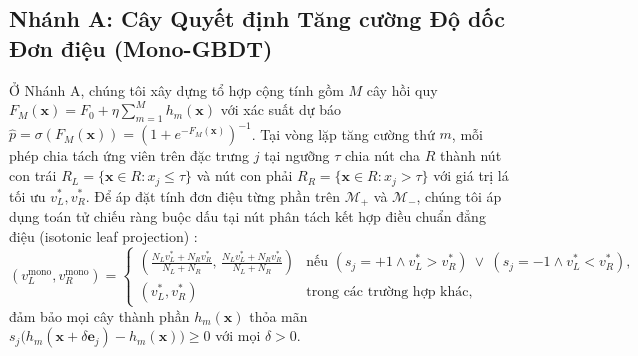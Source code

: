 \documentclass[11pt,a4paper]{article}
\begin{document}
\subsection{Nhánh A: Cây Quyết định Tăng cường Độ dốc Đơn điệu (Mono-GBDT)}
Ở Nhánh A, chúng tôi xây dựng tổ hợp cộng tính gồm $M$ cây hồi quy $F_M(\mathbf{x}) = F_0 + \eta \sum_{m=1}^M h_m(\mathbf{x})$ với xác suất dự báo $\hat{p} = \sigma(F_M(\mathbf{x})) = (1 + e^{-F_M(\mathbf{x})})^{-1}$. Tại vòng lặp tăng cường thứ $m$, mỗi phép chia tách ứng viên trên đặc trưng $j$ tại ngưỡng $\tau$ chia nút cha $R$ thành nút con trái $R_L = \{\mathbf{x} \in R : x_j \le \tau\}$ và nút con phải $R_R = \{\mathbf{x} \in R : x_j > \tau\}$ với giá trị lá tối ưu $v_L^*, v_R^*$. Để áp đặt tính đơn điệu từng phần trên $\mathcal{M}_+$ và $\mathcal{M}_-$, chúng tôi áp dụng toán tử chiếu ràng buộc dấu tại nút phân tách kết hợp điều chuẩn đẳng điệu (isotonic leaf projection) \citep{chen2016xgboost,ke2017lightgbm}:
\begin{equation}
    (v_L^{\text{mono}}, v_R^{\text{mono}}) = \begin{cases}
        \left(\frac{N_L v_L^* + N_R v_R^*}{N_L + N_R}, \, \frac{N_L v_L^* + N_R v_R^*}{N_L + N_R}\right) & \text{nếu } (s_j = +1 \wedge v_L^* > v_R^*) \ \vee \ (s_j = -1 \wedge v_L^* < v_R^*), \\[6pt]
        (v_L^*, v_R^*) & \text{trong các trường hợp khác},
    \end{cases}
\end{equation}
đảm bảo mọi cây thành phần $h_m(\mathbf{x})$ thỏa mãn $s_j \big(h_m(\mathbf{x} + \delta \mathbf{e}_j) - h_m(\mathbf{x})\big) \ge 0$ với mọi $\delta > 0$.
\end{document}

